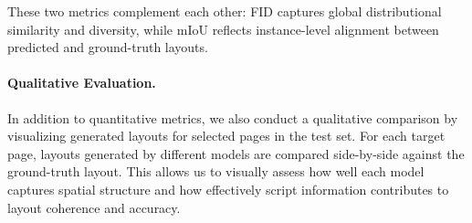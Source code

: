 \documentclass[sigconf, screen, review, anonymous]{acmart}
\begin{document}
These two metrics complement each other: FID captures global distributional similarity and diversity, while mIoU reflects instance-level alignment between predicted and ground-truth layouts.

\paragraph{Qualitative Evaluation.}
In addition to quantitative metrics, we also conduct a qualitative comparison by visualizing generated layouts for selected pages in the test set. For each target page, layouts generated by different models are compared side-by-side against the ground-truth layout. This allows us to visually assess how well each model captures spatial structure and how effectively script information contributes to layout coherence and accuracy.
\end{document}
